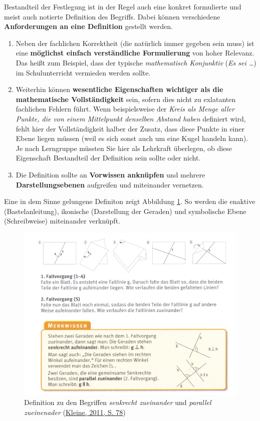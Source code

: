 \documentclass[
  ngerman,
]{scrbook}
\providecommand{\tightlist}{%
  \setlength{\itemsep}{0pt}\setlength{\parskip}{0pt}}
\theoremstyle{definition}
\theoremstyle{definition}
\theoremstyle{definition}
\theoremstyle{definition}
\theoremstyle{remark}
\begin{document}
Bestandteil der Festlegung ist in der Regel auch eine konkret formulierte und meist auch notierte Definition des Begriffs. Dabei können verschiedene \textbf{Anforderungen an eine Definition} gestellt werden.

\begin{enumerate}
\def\labelenumi{\arabic{enumi}.}
\tightlist
\item
  Neben der fachlichen Korrektheit (die natürlich immer gegeben sein muss) ist eine \textbf{möglichst einfach verständliche Formulierung} von hoher Relevanz. Das heißt zum Beispiel, dass der typische \emph{mathematisch Konjunktiv} (\emph{Es sei \ldots{}}) im Schulunterricht vermieden werden sollte.
\item
  Weiterhin können \textbf{wesentliche Eigenschaften wichtiger als die mathematische Vollständigkeit} sein, sofern dies nicht zu exlatanten fachlichen Fehlern führt. Wenn beispielsweise der \emph{Kreis als Menge aller Punkte, die von einem Mittelpunkt denselben Abstand haben} definiert wird, fehlt hier der Vollständigkeit halber der Zusatz, dass diese Punkte in einer Ebene liegen müssen (weil es sich sonst auch um eine Kugel handeln kann). Je nach Lerngruppe müssten Sie hier als Lehrkraft überlegen, ob diese Eigenschaft Bestandteil der Definition sein sollte oder nicht.
\item
  Die Definition sollte an \textbf{Vorwissen anknüpfen} und mehrere \textbf{Darstellungsebenen} aufgreifen und miteinander vernetzen.
\end{enumerate}

Eine in dem Sinne gelungene Definiton zeigt Abbildung \ref{fig:DefSenkrecht}. So werden die enaktive (Bastelanleitung), ikonische (Darstellung der Geraden) und symbolische Ebene (Schreibweise) miteinander verknüpft.



\begin{figure}

{\centering \includegraphics[width=1\linewidth]{pictures/6-SenkrechtDefinition} 

}

\caption{Definition zu den Begriffen \emph{senkrecht zueinander} und \emph{parallel zueinenader} (\protect\hyperlink{ref-Kleine2011}{Kleine, 2011, S. 78})}\label{fig:DefSenkrecht}
\end{figure}
\end{document}
